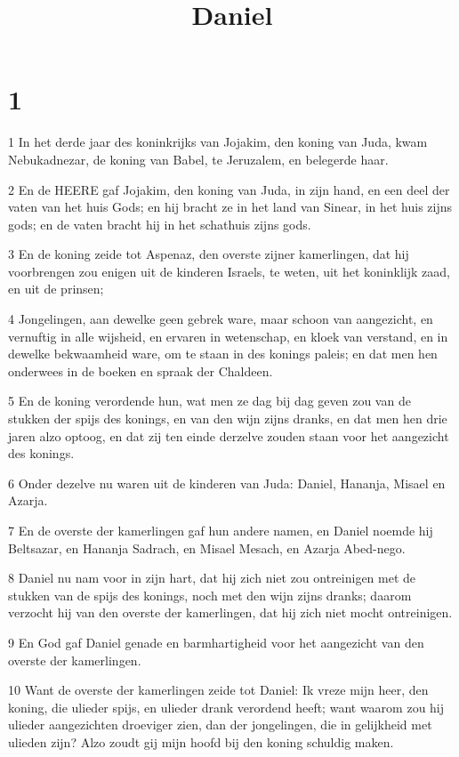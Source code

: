 

\title{Daniel}



\chapter{1}

\par 1 In het derde jaar des koninkrijks van Jojakim, den koning van Juda, kwam Nebukadnezar, de koning van Babel, te Jeruzalem, en belegerde haar.
\par 2 En de HEERE gaf Jojakim, den koning van Juda, in zijn hand, en een deel der vaten van het huis Gods; en hij bracht ze in het land van Sinear, in het huis zijns gods; en de vaten bracht hij in het schathuis zijns gods.
\par 3 En de koning zeide tot Aspenaz, den overste zijner kamerlingen, dat hij voorbrengen zou enigen uit de kinderen Israels, te weten, uit het koninklijk zaad, en uit de prinsen;
\par 4 Jongelingen, aan dewelke geen gebrek ware, maar schoon van aangezicht, en vernuftig in alle wijsheid, en ervaren in wetenschap, en kloek van verstand, en in dewelke bekwaamheid ware, om te staan in des konings paleis; en dat men hen onderwees in de boeken en spraak der Chaldeen.
\par 5 En de koning verordende hun, wat men ze dag bij dag geven zou van de stukken der spijs des konings, en van den wijn zijns dranks, en dat men hen drie jaren alzo optoog, en dat zij ten einde derzelve zouden staan voor het aangezicht des konings.
\par 6 Onder dezelve nu waren uit de kinderen van Juda: Daniel, Hananja, Misael en Azarja.
\par 7 En de overste der kamerlingen gaf hun andere namen, en Daniel noemde hij Beltsazar, en Hananja Sadrach, en Misael Mesach, en Azarja Abed-nego.
\par 8 Daniel nu nam voor in zijn hart, dat hij zich niet zou ontreinigen met de stukken van de spijs des konings, noch met den wijn zijns dranks; daarom verzocht hij van den overste der kamerlingen, dat hij zich niet mocht ontreinigen.
\par 9 En God gaf Daniel genade en barmhartigheid voor het aangezicht van den overste der kamerlingen.
\par 10 Want de overste der kamerlingen zeide tot Daniel: Ik vreze mijn heer, den koning, die ulieder spijs, en ulieder drank verordend heeft; want waarom zou hij ulieder aangezichten droeviger zien, dan der jongelingen, die in gelijkheid met ulieden zijn? Alzo zoudt gij mijn hoofd bij den koning schuldig maken.
